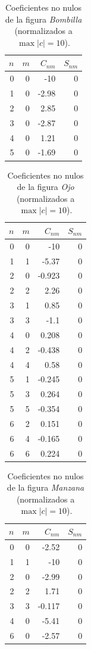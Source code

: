 \begin{table}[htbp]
\centering
\small
\caption{Coeficientes no nulos de la figura \emph{Bombilla} (normalizados a $\max|c| = 10$).}
\label{tab:coef-bombilla}
\begin{tabular}{rrrr}
\hline
$n$ & $m$ & $C_{nm}$ & $S_{nm}$ \\
\hline
0 & 0 & -10 & 0 \\
1 & 0 & -2.98 & 0 \\
2 & 0 & 2.85 & 0 \\
3 & 0 & -2.87 & 0 \\
4 & 0 & 1.21 & 0 \\
5 & 0 & -1.69 & 0 \\
\hline
\end{tabular}
\end{table}

\begin{table}[htbp]
\centering
\small
\caption{Coeficientes no nulos de la figura \emph{Ojo} (normalizados a $\max|c| = 10$).}
\label{tab:coef-ojo}
\begin{tabular}{rrrr}
\hline
$n$ & $m$ & $C_{nm}$ & $S_{nm}$ \\
\hline
0 & 0 & -10 & 0 \\
1 & 1 & -5.37 & 0 \\
2 & 0 & -0.923 & 0 \\
2 & 2 & 2.26 & 0 \\
3 & 1 & 0.85 & 0 \\
3 & 3 & -1.1 & 0 \\
4 & 0 & 0.208 & 0 \\
4 & 2 & -0.438 & 0 \\
4 & 4 & 0.58 & 0 \\
5 & 1 & -0.245 & 0 \\
5 & 3 & 0.264 & 0 \\
5 & 5 & -0.354 & 0 \\
6 & 2 & 0.151 & 0 \\
6 & 4 & -0.165 & 0 \\
6 & 6 & 0.224 & 0 \\
\hline
\end{tabular}
\end{table}

\begin{table}[htbp]
\centering
\small
\caption{Coeficientes no nulos de la figura \emph{Manzana} (normalizados a $\max|c| = 10$).}
\label{tab:coef-manzana}
\begin{tabular}{rrrr}
\hline
$n$ & $m$ & $C_{nm}$ & $S_{nm}$ \\
\hline
0 & 0 & -2.52 & 0 \\
1 & 1 & -10 & 0 \\
2 & 0 & -2.99 & 0 \\
2 & 2 & 1.71 & 0 \\
3 & 3 & -0.117 & 0 \\
4 & 0 & -5.41 & 0 \\
6 & 0 & -2.57 & 0 \\
\hline
\end{tabular}
\end{table}

